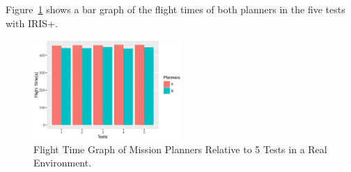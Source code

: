 \documentclass[conference,harvard,brazil,english]{sbatex}
\begin{document}
	\begin{table}[H]
\centering
{}
\caption{Mission Planners Flight Time - Real.\label{table:plannersReal}}
\end{table}

Figure~\ref{fig:GraPlannersReal} shows a bar graph of the flight times of both planners in the five tests with IRIS+.

\begin{figure}[H]
	\centering
	\includegraphics[width=0.5\textwidth]{GraPlannersReal.eps}
	\caption{Flight Time Graph of Mission Planners Relative to 5 Tests in a Real Environment.\label{fig:GraPlannersReal}}
	\end{figure}
	
\end{document}

